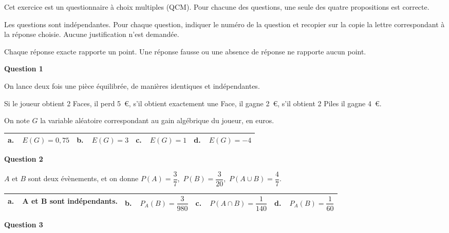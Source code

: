 \medskip

Cet exercice est un questionnaire à choix multiples (QCM). Pour chacune des questions, une seule des quatre propositions est correcte.

Les questions sont indépendantes. Pour chaque question, indiquer le numéro de la question et recopier sur la copie la lettre correspondant à la réponse choisie. Aucune justification n'est demandée.

Chaque réponse exacte rapporte un point. Une réponse fausse ou une absence de réponse ne rapporte aucun point.

\medskip

\textbf{Question 1}

\medskip

On lance deux fois une pièce équilibrée, de manières identiques et indépendantes.

Si le joueur obtient 2 Faces, il perd 5~\euro, s'il obtient exactement une Face, il gagne 2~\euro, s'il obtient 2 Piles il gagne 4~\euro.

 On note $G$ la variable aléatoire correspondant au gain algébrique du joueur, en euros.

\begin{center}
\begin{tabularx}{\linewidth}{|*{4}{X|}}\hline
\textbf{a.~~}$E(G) = 0,75$& \textbf{b.~~}$E(G) = 3$&\textbf{c.~~}$E(G) = 1$&\textbf{d.~~}$E(G) =- 4$ \\ \hline
\end{tabularx}
\end{center}

\medskip

\textbf{Question 2}

\medskip

$A$ et $B$ sont deux évènements, et on donne $P(A) = \dfrac{3}{7}$,\, $P(B) = \dfrac{3}{20}$,\, $P(A \cup B) = \dfrac{4}{7}$.

\begin{center}
\begin{tabularx}{\linewidth}{|*{4}{X|}}\hline
\textbf{a.~~}A et B sont indépendants.& \textbf{b.~~}$P_A(B) = \dfrac{3}{980}$&\textbf{c.~~}$P(A \cap B) = \dfrac{1}{140}$&\textbf{d.~~}$P_A(B) = \dfrac{1}{60}$ \\ \hline
\end{tabularx}
\end{center}

\medskip

\textbf{Question 3}

\medskip

